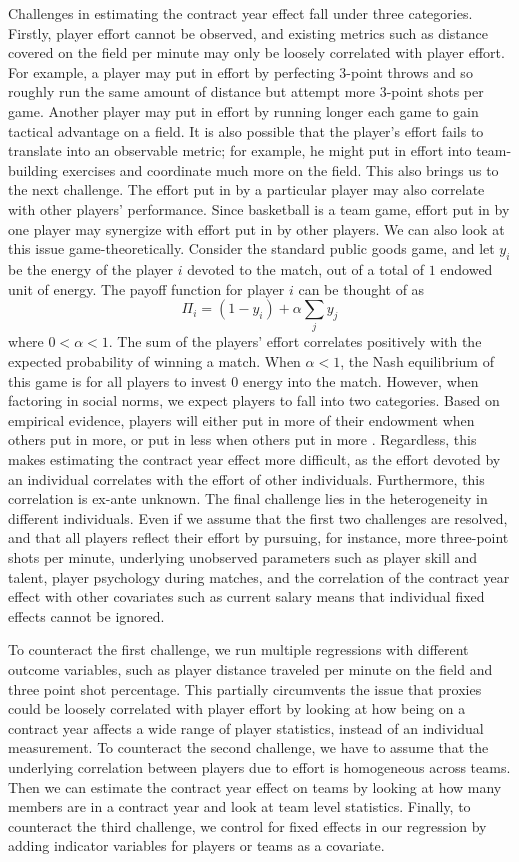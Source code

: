 \documentclass[12pt]{article}
\begin{document}
	Challenges in estimating the contract year effect fall under three categories. Firstly, player effort cannot be observed, and existing metrics such as distance covered on the field per minute may only be loosely correlated with player effort. For example, a player may put in effort by perfecting 3-point throws and so roughly run the same amount of distance but attempt more 3-point shots per game. Another player may put in effort by running longer each game to gain tactical advantage on a field. It is also possible that the player's effort fails to translate into an observable metric; for example, he might put in effort into team-building exercises and coordinate much more on the field. This also brings us to the next challenge. The effort put in by a particular player may also correlate with other players' performance. Since basketball is a team game, effort put in by one player may synergize with effort put in by other players. We can also look at this issue game-theoretically. Consider the standard public goods game, and let $y_i$ be the energy of the player $i$ devoted to the match, out of a total of $1$ endowed unit of energy. The payoff function for player $i$ can be thought of as \[
	\Pi_i = \left(1 - y_i\right) + \alpha \sum_{j} y_j
	\] where $0<\alpha<1$. The sum of the players' effort correlates positively with the expected probability of winning a match. When $\alpha<1$, the Nash equilibrium of this game is for all players to invest $0$ energy into the match. However, when factoring in social norms, we expect players to fall into two categories. Based on empirical evidence, players will either put in more of their endowment when others put in more, or put in less when others put in more \citep{dong_dynamics_2016}. Regardless, this makes estimating the contract year effect more difficult, as the effort devoted by an individual correlates with the effort of other individuals. Furthermore, this correlation is ex-ante unknown. The final challenge lies in the heterogeneity in different individuals. Even if we assume that the first two challenges are resolved, and that all players reflect their effort by pursuing, for instance, more three-point shots per minute, underlying unobserved parameters such as player skill and talent, player psychology during matches, and the correlation of the contract year effect with other covariates such as current salary means that individual fixed effects cannot be ignored.
	
	To counteract the first challenge, we run multiple regressions with different outcome variables, such as player distance traveled per minute on the field and three point shot percentage. This partially circumvents the issue that proxies could be loosely correlated with player effort by looking at how being on a contract year affects a wide range of player statistics, instead of an individual measurement. To counteract the second challenge, we have to assume that the underlying correlation between players due to effort is homogeneous across teams. Then we can estimate the contract year effect on teams by looking at how many members are in a contract year and look at team level statistics. Finally, to counteract the third challenge, we control for fixed effects in our regression by adding indicator variables for players or teams as a covariate.
	
\end{document}
